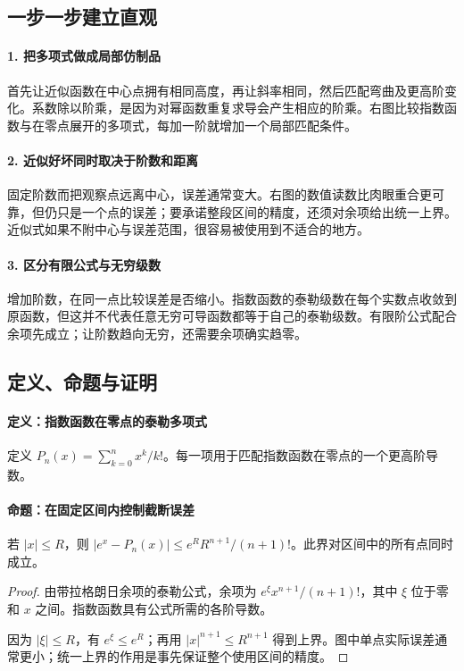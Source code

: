 \subsection*{一步一步建立直观}

\paragraph{1. 把多项式做成局部仿制品}

首先让近似函数在中心点拥有相同高度，再让斜率相同，然后匹配弯曲及更高阶变化。系数除以阶乘，是因为对幂函数重复求导会产生相应的阶乘。右图比较指数函数与在零点展开的多项式，每加一阶就增加一个局部匹配条件。



\paragraph{2. 近似好坏同时取决于阶数和距离}

固定阶数而把观察点远离中心，误差通常变大。右图的数值读数比肉眼重合更可靠，但仍只是一个点的误差；要承诺整段区间的精度，还须对余项给出统一上界。近似式如果不附中心与误差范围，很容易被使用到不适合的地方。



\paragraph{3. 区分有限公式与无穷级数}

增加阶数，在同一点比较误差是否缩小。指数函数的泰勒级数在每个实数点收敛到原函数，但这并不代表任意无穷可导函数都等于自己的泰勒级数。有限阶公式配合余项先成立；让阶数趋向无穷，还需要余项确实趋零。



\subsection*{定义、命题与证明}

\paragraph{定义：指数函数在零点的泰勒多项式}

定义 $P_n(x)=\sum_{k=0}^n x^k/k!$。每一项用于匹配指数函数在零点的一个更高阶导数。

\paragraph{命题：在固定区间内控制截断误差}

若 $|x|\le R$，则 $|e^x-P_n(x)|\le e^R R^{n+1}/(n+1)!$。此界对区间中的所有点同时成立。

\begin{proof}

由带拉格朗日余项的泰勒公式，余项为 $e^\xi x^{n+1}/(n+1)!$，其中 $\xi$ 位于零和 $x$ 之间。指数函数具有公式所需的各阶导数。

因为 $|\xi|\le R$，有 $e^\xi\le e^R$；再用 $|x|^{n+1}\le R^{n+1}$ 得到上界。图中单点实际误差通常更小；统一上界的作用是事先保证整个使用区间的精度。

\end{proof}
